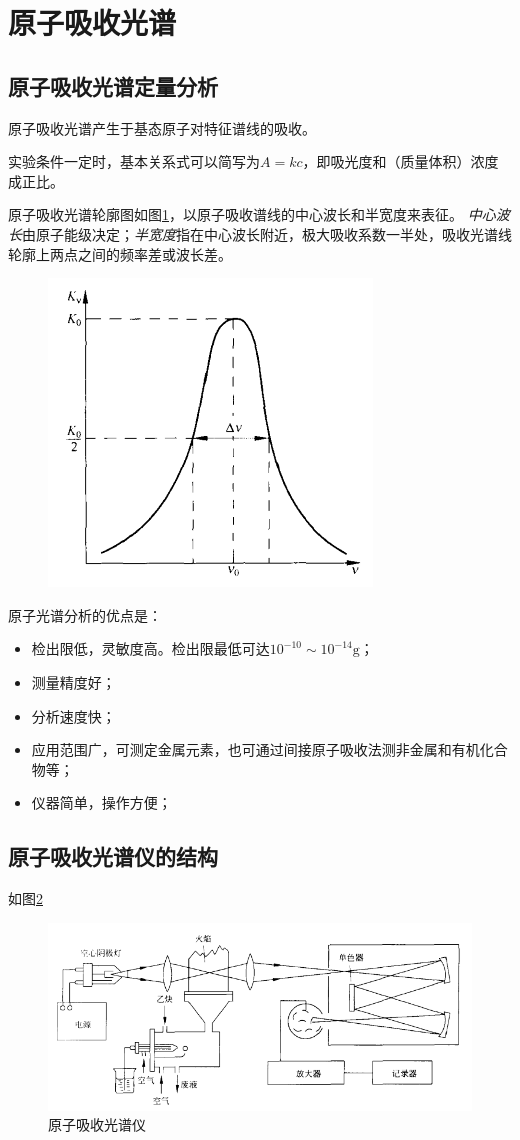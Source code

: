 \section{原子吸收光谱}

\subsection{原子吸收光谱定量分析}
原子吸收光谱产生于基态原子对特征谱线的吸收。

实验条件一定时，基本关系式可以简写为$A=kc$，即吸光度和（质量体积）浓度成正比。

原子吸收光谱轮廓图如图\ref{fig:chp8absorption}，以原子吸收谱线的中心波长和半宽度来表征。
\textit{中心波长}由原子能级决定；\textit{半宽度}指在中心波长附近，极大吸收系数一半处，吸收光谱线轮廓上两点之间的频率差或波长差。

\begin{figure}[!h]
	\centering
	\includegraphics[width=0.4\linewidth]{image/chp8_absorption}
	\caption{}
	\label{fig:chp8absorption}
\end{figure}

原子光谱分析的优点是：
\begin{itemize}
	\item 检出限低，灵敏度高。检出限最低可达$10^{-10}\sim 10^{-14}\mathrm{g}$；
	\item 测量精度好；
	\item 分析速度快；
	\item 应用范围广，可测定金属元素，也可通过间接原子吸收法测非金属和有机化合物等；
	\item 仪器简单，操作方便；
\end{itemize}

\subsection{原子吸收光谱仪的结构}

如图\ref{fig:chp8instrument}
\begin{figure}[!h]
	\centering
	\includegraphics[width=0.7\linewidth]{image/chp8_instrument}
	\caption{原子吸收光谱仪}
	\label{fig:chp8instrument}
\end{figure}

